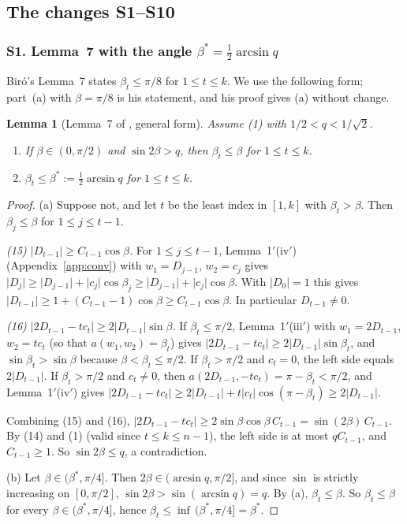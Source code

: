 \documentclass[11pt]{amsart}
\newtheorem{lemma}[theorem]{Lemma}
\theoremstyle{remark}
\theoremstyle{plain}
\newcommand{\abs}[1]{\lvert #1\rvert}
\begin{document}
\subsection{The changes S1--S10}\label{sec:changes}

\subsubsection*{S1. Lemma~7 with the angle $\beta^*=\frac12\arcsin q$}
Bir\'o's Lemma~7 states $\beta_t\le\pi/8$ for $1\le t\le k$. We use the following form; part~(a) with $\beta=\pi/8$ is his statement, and his proof gives (a) without change.

\begin{lemma}[Lemma~7 of \cite{Bir00b}, general form]\label{lem:beta}
Assume \textup{(1)} with $1/2<q<1/\sqrt2$.
\begin{enumerate}[label=\textup{(\alph*)}]
\item If $\beta\in(0,\pi/2)$ and $\sin2\beta>q$, then $\beta_t\le\beta$ for $1\le t\le k$.
\item $\beta_t\le\beta^*:=\frac12\arcsin q$ for $1\le t\le k$.
\end{enumerate}
\end{lemma}

\begin{proof}
(a) Suppose not, and let $t$ be the least index in $[1,k]$ with $\beta_t>\beta$. Then $\beta_j\le\beta$ for $1\le j\le t-1$.

\emph{(15) $\abs{D_{t-1}}\ge C_{t-1}\cos\beta$.} For $1\le j\le t-1$, Lemma~1$'$(iv$'$) (Appendix~\ref{app:conv}) with $w_1=D_{j-1}$, $w_2=c_j$ gives $\abs{D_j}\ge\abs{D_{j-1}}+\abs{c_j}\cos\beta_j\ge\abs{D_{j-1}}+\abs{c_j}\cos\beta$. With $\abs{D_0}=1$ this gives $\abs{D_{t-1}}\ge1+(C_{t-1}-1)\cos\beta\ge C_{t-1}\cos\beta$. In particular $D_{t-1}\ne0$.

\emph{(16) $\abs{2D_{t-1}-tc_t}\ge2\abs{D_{t-1}}\sin\beta$.} If $\beta_t\le\pi/2$, Lemma~1$'$(iii$'$) with $w_1=2D_{t-1}$, $w_2=tc_t$ (so that $a(w_1,w_2)=\beta_t$) gives $\abs{2D_{t-1}-tc_t}\ge2\abs{D_{t-1}}\sin\beta_t$, and $\sin\beta_t>\sin\beta$ because $\beta<\beta_t\le\pi/2$. If $\beta_t>\pi/2$ and $c_t=0$, the left side equals $2\abs{D_{t-1}}$. If $\beta_t>\pi/2$ and $c_t\ne0$, then $a(2D_{t-1},-tc_t)=\pi-\beta_t<\pi/2$, and Lemma~1$'$(iv$'$) gives $\abs{2D_{t-1}-tc_t}\ge2\abs{D_{t-1}}+t\abs{c_t}\cos(\pi-\beta_t)\ge2\abs{D_{t-1}}$.

Combining (15) and (16), $\abs{2D_{t-1}-tc_t}\ge2\sin\beta\cos\beta\,C_{t-1}=\sin(2\beta)\,C_{t-1}$. By (14) and (1) (valid since $t\le k\le n-1$), the left side is at most $qC_{t-1}$, and $C_{t-1}\ge1$. So $\sin2\beta\le q$, a contradiction.

(b) Let $\beta\in(\beta^*,\pi/4]$. Then $2\beta\in(\arcsin q,\pi/2]$, and since $\sin$ is strictly increasing on $[0,\pi/2]$, $\sin2\beta>\sin(\arcsin q)=q$. By (a), $\beta_t\le\beta$. So $\beta_t\le\beta$ for every $\beta\in(\beta^*,\pi/4]$, hence $\beta_t\le\inf\,(\beta^*,\pi/4]=\beta^*$.
\end{proof}
\end{document}
